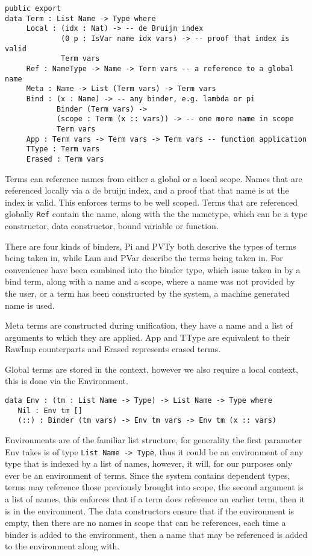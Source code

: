 \documentclass[a4paper]{article}
\begin{document}
\begin{center}
\begin{verbatim}
public export
data Term : List Name -> Type where
	 Local : (idx : Nat) -> -- de Bruijn index
			 (0 p : IsVar name idx vars) -> -- proof that index is valid
			 Term vars
	 Ref : NameType -> Name -> Term vars -- a reference to a global name
	 Meta : Name -> List (Term vars) -> Term vars
	 Bind : (x : Name) -> -- any binder, e.g. lambda or pi
			Binder (Term vars) ->
			(scope : Term (x :: vars)) -> -- one more name in scope
			Term vars
	 App : Term vars -> Term vars -> Term vars -- function application
	 TType : Term vars
	 Erased : Term vars
\end{verbatim}
\end{center}

Terms can reference names from either a global or a local scope. Names that are referenced locally
via a de bruijn index, and a proof that that name is at the index is valid. This enforces terms to
be well scoped. Terms that are referenced globally \texttt{Ref} contain the name, along with the the nametype, 
which can be a type constructor, data constructor, bound variable or function. 

There are four kinds of binders, Pi and PVTy both descrive the types 
of terms being taken in, while Lam and PVar describe the terms being
taken in. For convenience have been combined into the binder type, which issue
taken in by a bind term, along with a name and a scope, where a name was not provided by the user, or a 
term has been constructed by the system, a machine generated name is used. 

Meta terms are constructed during unification, they have a name and a list of arguments to which
they are applied. App and TType are equivalent to their RawImp counterparts and Erased represents
erased terms.

Global terms are stored in the context, however we also require a local
context, this is done via the Environment. 

\begin{center}
\begin{verbatim}
data Env : (tm : List Name -> Type) -> List Name -> Type where
   Nil : Env tm []
   (::) : Binder (tm vars) -> Env tm vars -> Env tm (x :: vars)
\end{verbatim}
\end{center}

Environments are of the familiar list structure, for generality the first parameter 
Env takes is of type \texttt{List Name -> Type}, thus it could be an environment of any type 
that is indexed by a list of names, however, it will, for our purposes only ever be an 
environment of terms. Since the system contains dependent types, terms may reference 
those previously brought into scope, the second argument is a list of names, this
enforces that if a term does reference an earlier term, then it is in the environment. 
The data constructors ensure that if the environment is empty, then there are no names
in scope that can be references, each time a binder is added to the environment, then 
a name that may be referenced is added to the environment along with.  
\end{document}
